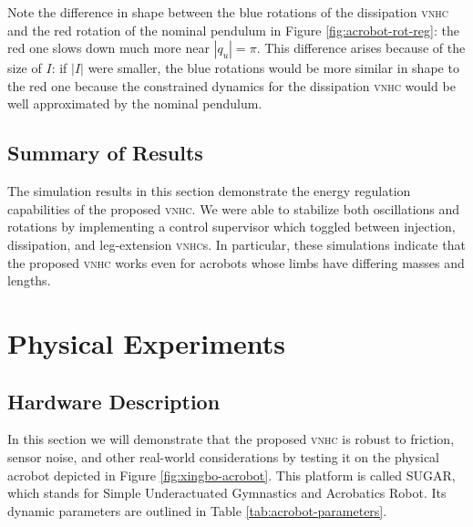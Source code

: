 \documentclass[journal,twoside,web, twocolumn,draftcls]{ieeecolor}
\newcommand*{\vnhc}{\textsc{vnhc}\xspace}
\newcommand*{\vnhcs}{\textsc{vnhc}s\xspace}
\begin{document}
Note the difference in shape between the blue rotations of the dissipation \vnhc
and the red rotation of the nominal pendulum in Figure
\ref{fig:acrobot-rot-reg}: the red one slows down much more
near \(|q_u| = \pi\).
This difference arises because of the size of \(I\):
if \(|I|\) were smaller, the blue rotations would be more similar in shape to the
red one because the constrained dynamics for the dissipation \vnhc would be
well approximated by the nominal pendulum.

\subsection{Summary of Results}
The simulation results in this section demonstrate the energy regulation
capabilities of the proposed \vnhc.  
We were able to stabilize both oscillations and rotations by implementing a
control supervisor which toggled between injection, dissipation, and
leg-extension \vnhcs.
In particular, these simulations indicate that the proposed \vnhc
works even for acrobots whose limbs have differing masses and lengths.

\section{Physical Experiments}\label{sec:experiments}

\subsection{Hardware Description}
In this section we will demonstrate that the proposed \vnhc is robust to friction, sensor
noise, and other real-world considerations by testing it on the physical
acrobot depicted in Figure \ref{fig:xingbo-acrobot}.
This platform is called SUGAR, which stands for
Simple Underactuated Gymnastics and Acrobatics Robot.
Its dynamic parameters are outlined in Table \ref{tab:acrobot-parameters}.
\end{document}
